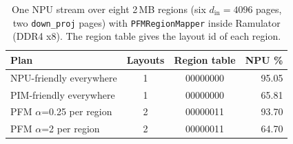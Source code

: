 \begin{table}[t]
\centering
\caption{One NPU stream over eight 2\,MB regions (six $d_{\mathrm{in}}{=}4096$ pages, two \texttt{down\_proj} pages) with \texttt{PFMRegionMapper} inside Ramulator (DDR4 x8). The region table gives the layout id of each region.}
\label{tab:region}
\setlength{\tabcolsep}{4pt}
\begin{tabular}{lccr}
\toprule
Plan & Layouts & Region table & NPU \% \\
\midrule
NPU-friendly everywhere & 1 & 00000000 & 95.05 \\
PIM-friendly everywhere & 1 & 00000000 & 65.81 \\
PFM $\alpha$=0.25 per region & 2 & 00000011 & 93.70 \\
PFM $\alpha$=2 per region & 2 & 00000011 & 64.70 \\
\bottomrule
\end{tabular}
\end{table}

